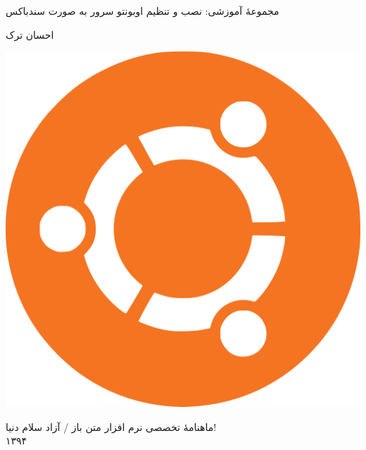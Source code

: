 \begin{center}
    \thispagestyle{empty}
    \HUGE
    \noindent
       مجموعهٔ آموزشی:
   \HUGE 
       نصب و تنظیم اوبونتو سرور به صورت سندباکس
       
       
        \LARGE
        احسان ترک

       \vfill

           
               \includegraphics[width=.65\textwidth ,height=.65\textwidth]{Pic/logo}
            

       \vfill
       \noindent
      ماهنامهٔ تخصصی نرم افزار متن باز / آزاد سلام دنیا!\\
       \hspace*{1pt}%
        ۱۳۹۴
       \vspace*{3\baselineskip}

       
\end{center} 
\newpage

